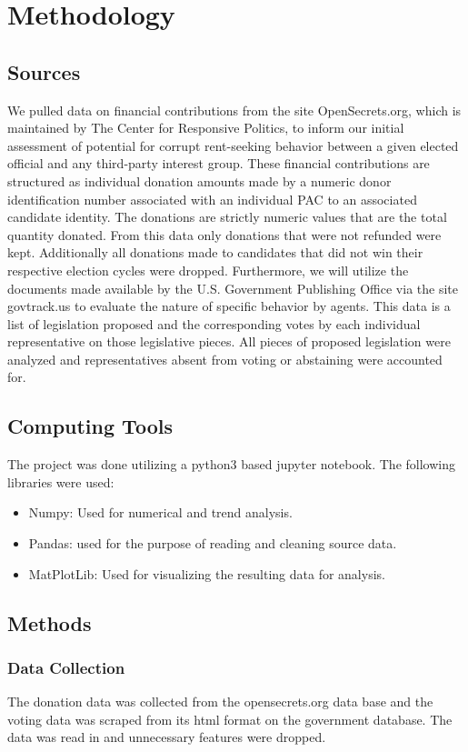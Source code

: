 \documentclass[journal]{IEEEtran}
\begin{document}
\section{Methodology}
\subsection{Sources}
We pulled data on financial contributions from the site OpenSecrets.org, which is maintained by The Center for Responsive Politics, 
to inform our initial assessment of potential for corrupt rent-seeking behavior between a given elected official and any third-party 
interest group. These financial contributions are structured as individual donation amounts made by a numeric donor identification 
number associated with an individual PAC to an associated candidate identity. The donations are strictly numeric values that are the 
total quantity donated. From this data only donations that were not refunded were kept. Additionally all donations made to candidates
that did not win their respective election cycles were dropped.
\newline
  Furthermore, we will utilize the documents made available by the U.S. Government Publishing Office via the site govtrack.us to 
evaluate the nature of specific behavior by agents. This data is a list of legislation proposed and the corresponding votes by each 
individual representative on those legislative pieces. All pieces of proposed legislation were analyzed and representatives absent 
from voting or abstaining were accounted for.

\subsection{Computing Tools}
The project was done utilizing a python3 based jupyter notebook. The following libraries were used:
\begin{itemize}
 \item Numpy: Used for numerical and trend analysis.
 \item Pandas: used for the purpose of reading and cleaning source data.
 \item MatPlotLib: Used for visualizing the resulting data for analysis.
\end{itemize}

\subsection{Methods}
 \subsubsection{Data Collection} 
 The donation data was collected from the opensecrets.org data base and the voting data was scraped from its
 html format on the government database. The data was read in and unnecessary features were dropped.
\end{document}
